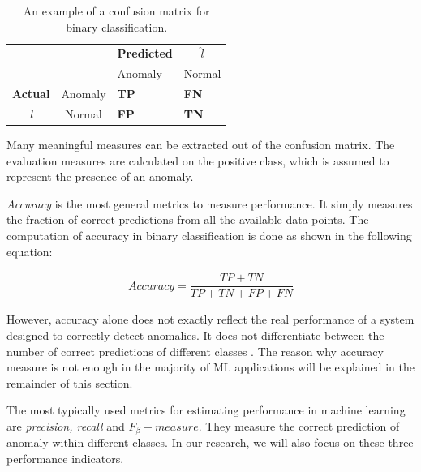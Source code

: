 \begin{table}[!h]
\centering
\begin{tabular}{cccc}
\multicolumn{1}{r}{}                 &                              & \textbf{Predicted}          &   $\hat{l}$                          \\ \cline{3-4} 
                                     & \multicolumn{1}{l|}{}        & \multicolumn{1}{l|}{Anomaly} & \multicolumn{1}{l|}{Normal} \\ \cline{2-4} 
                                      
\multicolumn{1}{l|}{\textbf{Actual}} & \multicolumn{1}{l|}{Anomaly}  & \multicolumn{1}{l|}{\textcolor{customBlue}{\textbf{TP}}}     & \multicolumn{1}{l|}{\textcolor{customRed}{\textbf{FN}}}      \\ \cline{2-4} 
\multicolumn{1}{c|}{\textit{l}}                & \multicolumn{1}{c|}{Normal} & \multicolumn{1}{l|}{\textcolor{customDarkRed}{\textbf{FP}}}     & \multicolumn{1}{l|}{\textcolor{customGreen}{\textbf{TN}}}     \\ \cline{2-4} 
\end{tabular}
\caption{An example of a confusion matrix for binary classification.}
\label{table:confusionMatrix}
\end{table}
 
Many meaningful measures can be extracted out of the confusion matrix. The evaluation measures are calculated on the positive class, which is assumed to represent the presence of an anomaly.

\textit{Accuracy} is the most general metrics to measure performance. It simply measures the fraction of correct predictions from all the available data points. The computation of accuracy in binary classification is done as shown in the following equation:

\begin{align}
    Accuracy = \dfrac{TP + TN}{TP + TN + FP + FN}
\end{align}

However, accuracy alone does not exactly reflect the real performance of a system designed to correctly detect anomalies. It does not differentiate between the number of correct predictions of different classes \cite{performanceEvaluation2006}. The reason why accuracy measure is not enough in the majority of ML applications will be explained in the remainder of this section. 

The most typically used metrics for estimating performance in machine learning are \textit{precision, recall} and ${F_{\beta}-measure}$. They measure the correct prediction of anomaly within different classes. In our research, we will also focus on these three  performance indicators.

